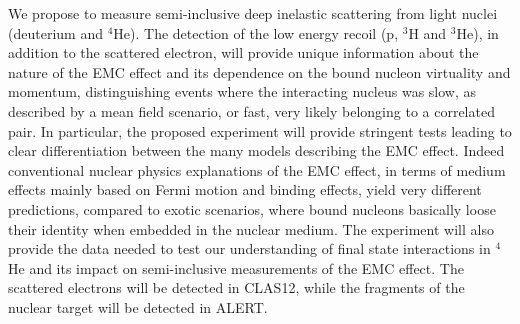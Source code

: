 We propose to measure semi-inclusive deep inelastic scattering from light nuclei
(deuterium and $^4$He). The detection of the low energy recoil (p, $^3$H and $^3$He), in addition to
the scattered electron, will provide unique information about the nature of the EMC effect
and its dependence on the bound nucleon virtuality and momentum, distinguishing
events where the interacting nucleus was slow, as described by a mean field scenario,
or fast, very likely belonging to a correlated pair. In particular, the proposed experiment
will provide stringent tests leading to clear differentiation between the many models
describing the EMC effect. Indeed conventional nuclear physics explanations of the
EMC effect, in terms of medium effects mainly based on Fermi motion and binding
effects, yield very different predictions, compared to exotic scenarios, where bound
nucleons basically loose their identity when embedded in the nuclear medium.
The experiment will also provide the data needed to test our understanding of
final state interactions in $^4$He and its impact on semi-inclusive measurements of the EMC
effect. The scattered electrons will be detected in CLAS12, while the fragments of the
nuclear target will be detected in ALERT.

\newpage

